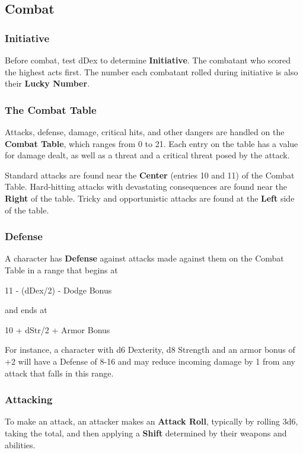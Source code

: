 \documentclass[10pt,twoside,twocolumn,openany]{book}
\begin{document}
\subsection{Combat}
\subsubsection{Initiative}
Before combat, test dDex to determine \textbf{Initiative}. The combatant who scored the highest acts first. The number each combatant rolled during initiative is also their \textbf{Lucky Number}.

\subsubsection{The Combat Table}
Attacks, defense, damage, critical hits, and other dangers are handled on the \textbf{Combat Table}, which ranges from 0 to 21. Each entry on the table has a value for damage dealt, as well as a threat and a critical threat posed by the attack.

Standard attacks are found near the \textbf{Center} (entries 10 and 11) of the Combat Table. Hard-hitting attacks with devastating consequences are found near the \textbf{Right} of the table. Tricky and opportunistic attacks are found at the \textbf{Left} side of the table.

\subsubsection{Defense}
A character has \textbf{Defense} against attacks made against them on the Combat Table in a range that begins at
\begin{center} 11 - (dDex/2) - Dodge Bonus \end{center}
\noindent and ends at
\begin{center} 10 + dStr/2 + Armor Bonus \end{center}
For instance, a character with d6 Dexterity, d8 Strength and an armor bonus of +2 will have a Defense of 8-16 and may reduce incoming damage by 1 from any attack that falls in this range.

\subsubsection{Attacking}
To make an attack, an attacker makes an \textbf{Attack Roll}, typically by rolling 3d6, taking the total, and then applying a \textbf{Shift} determined by their weapons and abilities.
\end{document}

